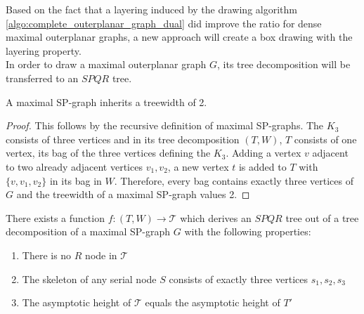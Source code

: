 Based on the fact that a layering induced by the drawing algorithm \ref{algo:complete_outerplanar_graph_dual} did improve the ratio for dense maximal outerplanar graphs, a new approach will create a box drawing with the layering property.\\
In order to draw a maximal outerplanar graph $G$, its tree decomposition will be transferred to an $SPQR$ tree.
\begin{lemma}
	A maximal SP-graph inherits a treewidth of 2.
\end{lemma}
\begin{proof}
	This follows by the recursive definition of maximal SP-graphs. The $K_3$ consists of three vertices and in its tree decomposition $(T,W)$, $T$ consists of one vertex, its bag of the three vertices defining the $K_3$. Adding a vertex $v$ adjacent to two already adjacent vertices $v_1,v_2$, a new vertex $t$ is added to $T$ with $\{v,v_1,v_2\}$ in its bag in $W$. Therefore, every bag contains exactly three vertices of $G$ and the treewidth of a maximal SP-graph values 2.
\end{proof}
\begin{lemma}
	There exists a function $f: (T,W) \to \mathcal{T}$ which derives an $SPQR$ tree out of a tree decomposition of a maximal SP-graph $G$ with the following properties:
	\begin{enumerate}
		\item There is no $R$ node in $\mathcal{T}$
		\item The skeleton of any serial node $S$ consists of exactly three vertices $s_1,s_2,s_3$
		\item The asymptotic height of $\mathcal{T}$ equals the asymptotic height of $T'$		
	\end{enumerate}
\end{lemma}
